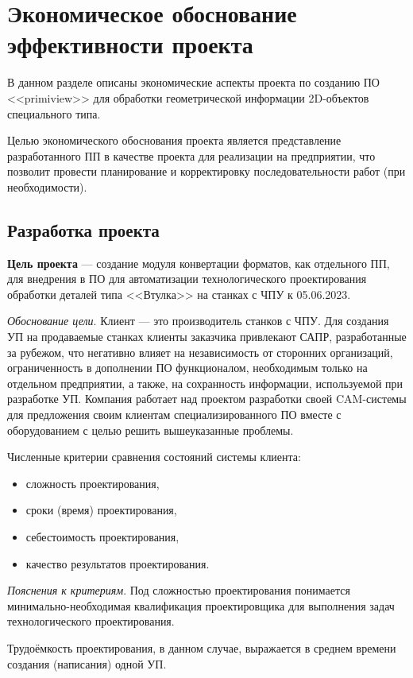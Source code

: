 \chapter{Экономическое обоснование эффективности проекта}
\label{cha:wirtsch}

В данном разделе описаны экономические аспекты проекта по созданию ПО <<primiview>> для обработки геометрической информации 2D-объектов специального типа.

Целью экономического обоснования проекта является представление разработанного ПП в качестве проекта для реализации на предприятии, что позволит провести планирование и корректировку последовательности работ (при необходимости).

\section{Разработка проекта}

\textbf{Цель проекта} --- создание модуля конвертации форматов, как отдельного ПП, для внедрения в ПО для автоматизации технологического проектирования обработки деталей типа <<Втулка>> на станках с ЧПУ к 05.06.2023.

\textit{Обоснование цели}. Клиент --- это производитель станков с ЧПУ. Для создания УП на продаваемые станках клиенты заказчика привлекают САПР, разработанные за рубежом, что негативно влияет на независимость от сторонних организаций, ограниченность в дополнении ПО функционалом, необходимым только на отдельном предприятии, а также, на сохранность информации, используемой при разработке УП. Компания работает над проектом разработки своей CAM-системы для предложения своим клиентам специализированного ПО вместе с оборудованием с целью решить вышеуказанные проблемы. 

Численные критерии сравнения состояний системы клиента:
\begin{itemize}
	\item сложность проектирования,
	\item сроки (время) проектирования,
	\item себестоимость проектирования,
	\item качество результатов проектирования.
\end{itemize}

\textit{Пояснения к критериям}. Под сложностью проектирования понимается минимально-необходимая квалификация проектировщика для выполнения задач технологического проектирования.

Трудоёмкость проектирования, в данном случае, выражается в среднем времени создания (написания) одной УП.

